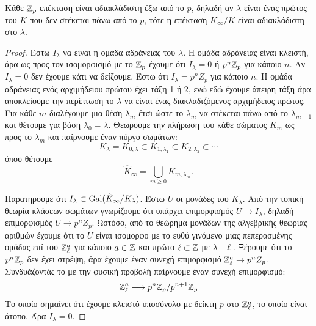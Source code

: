 \begin{prop}
    Κάθε $\mathbb{Z}_p$-επέκταση είναι αδιακλάδιστη έξω από το $p$, δηλαδή αν $\lambda$ είναι ένας πρώτος του $K$ που δεν στέκεται πάνω από το $p$, τότε η επέκταση $K_{\infty}/K$ είναι αδιακλάδιστη στο $\lambda$.

\end{prop}
\begin{proof}
    Έστω $I_{\lambda}$ να είναι η ομάδα αδράνειας του $\lambda$. Η ομάδα αδράνειας είναι κλειστή, άρα ως προς τον ισομορφισμό με το $\mathbb{Z}_p$ 
    έχουμε ότι $I_\lambda = 0$ ή $p^n \mathbb{Z}_p$ για κάποιο $n$. Αν $I_\lambda = 0$ δεν έχουμε κάτι να δείξουμε. Έστω ότι $I_\lambda = p^n Z_p$ για κάποιο $n$. Η ομάδα αδράνειας ενός αρχιμήδειου πρώτου έχει τάξη 1 ή 2, ενώ εδώ έχουμε άπειρη τάξη άρα αποκλείουμε την περίπτωση το $\lambda$ να είναι ένας διακλαδιζόμενος αρχιμήδειος πρώτος. Για κάθε $m$ διαλέγουμε μια θέση $\lambda_m$ έτσι ώστε το $\lambda_m$ να στέκεται πάνω από το $\lambda_{m-1}$ και θέτουμε για βάση $\lambda_0 = \lambda$. Θεωρούμε την πλήρωση του κάθε σώματος $K_m$ ως προς το $\lambda_m$ και παίρνουμε έναν πύργο σωμάτων:
    $$K_\lambda = K_{0,\lambda} \subset K_{1,\lambda_1} \subset K_{2,\lambda_2} \subset \cdots $$ όπου θέτουμε
    $$\hat{K}_\infty = \bigcup\limits_{m\geq 0}K_{m,\lambda_m}.$$
    
    \noindent Παρατηρούμε ότι $I_\lambda \subset \operatorname{Gal}(\hat{K}_\infty/ K_\lambda)$. Έστω $U$ οι μονάδες του $K_\lambda$. Από την τοπική 
    θεωρία κλάσεων σωμάτων \cite{Milne2} γνωρίζουμε ότι υπάρχει επιμορφισμός $U\rightarrow I_\lambda$, δηλαδή επιμορφισμός 
    $U\rightarrow p^n Z_p$. Ωστόσο, από το θεώρημα μονάδων της αλγεβρικής θεωρίας αριθμών έχουμε ότι το $U$ είναι ισομορφο με το ευθύ γινόμενο μιας πεπερασμένης ομάδας επί του $\mathbb{Z}_{\ell}^a$ για κάποιο $a \in \mathbb{Z}$ και πρώτο $\ell \subset \mathbb{Z}$ με $\lambda \mid \ell$. Ξέρουμε ότι το $p^n \mathbb{Z}_p$ δεν έχει στρέψη, άρα έχουμε έναν συνεχή επιμορφισμό $\mathbb{Z}_{\ell}^a \rightarrow p^n Z_p$. Συνδυάζοντάς το με την φυσική προβολή παίρνουμε έναν συνεχή επιμορφισμό:
    $$\mathbb{Z}_{\ell}^a \longrightarrow p^n \mathbb{Z}_p / p^{n+1}\mathbb{Z}_p$$
    Το οποίο σημαίνει ότι έχουμε κλειστό υποσύνολο με δείκτη $p$ στο $\mathbb{Z}_{\ell}^a$, το οποίο είναι άτοπο. Άρα $I_{\lambda}=0$.
\end{proof}

